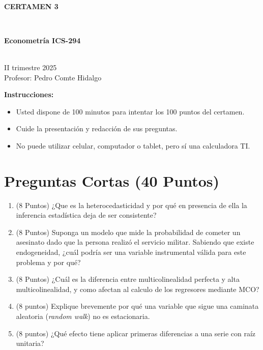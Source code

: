 \documentclass[10pt,a4paper]{article}
\begin{document}
\vspace{5cm}



\begin{center}
\begin{large}
\textbf{\\CERTAMEN 3}
\end{large}\\
\end{center}

\begin{center}
\begin{large}
\textbf{Econometría ICS-294}
\end{large}\\
\vspace{0.2cm}
II trimestre 2025\\
Profesor: Pedro Comte Hidalgo
\end{center}

\textbf{Instrucciones:} 

\begin{itemize}

    \item Usted dispone de 100 minutos  para intentar los 100 puntos del certamen.
    \item Cuide la presentación y redacción de sus preguntas.
    \item No puede utilizar celular, computador o tablet, pero sí una calculadora TI.
     
\end{itemize}

\section{Preguntas Cortas (40 Puntos)}

\begin{enumerate}

\item (8 Puntos) ¿Que es la heterocedasticidad y por qué en presencia de ella la inferencia estadística deja de ser consistente?


\item (8 Puntos) Suponga un modelo que mide la probabilidad de cometer un asesinato dado que la persona realizó el servicio militar. Sabiendo que existe endogeneidad, ¿cuál podría ser una variable instrumental válida para este problema y por qué? 


\item (8 Puntos) ¿Cuál es la diferencia entre multicolinealidad perfecta y alta multicolinealidad, y como afectan al calculo de los regresores mediante MCO?

\item (8 puntos) Explique brevemente por qué una variable que sigue una caminata aleatoria (\textit{random walk}) no es estacionaria.

\item (8 puntos) ¿Qué efecto tiene aplicar primeras diferencias a una serie con raíz unitaria?


\end{enumerate}
\end{document}
